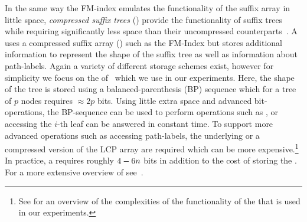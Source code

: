 In the same way the FM-index emulates the functionality of the suffix array in
little space, {\it compressed suffix trees} (\CST) provide the functionality
of suffix trees while requiring significantly less space than their uncompressed
counterparts~\cite{s-tcs07}. A \CST uses a compressed suffix array (\CSA) such
as the FM-Index but stores additional information to represent the shape of
the suffix tree as well as information about path-labels. Again a variety
of different storage schemes exist, however for simplicity we focus on
the \CST of~ which we use in our experiments. Here, the 
shape of the tree is stored using a balanced-parenthesis (BP) sequence which 
for a tree of $p$ nodes requires $\approx 2p$ bits. Using little extra space
and advanced bit-operations, the BP-sequence can be used to perform 
operations such as ,  or 
accessing the $i$-th leaf can be answered in constant time.
To support more advanced operations such as accessing path-labels,
the underlying \CSA or a compressed version of the LCP array are required
which can be more expensive.\footnote{See \supp for an overview of the complexities
of the functionality of the \CST that is used in our experiments.} 
In practice, a \CST requires roughly $4-6n$ bits in addition to the
cost of storing the \CSA. For a more extensive overview of \CSTs see~.
